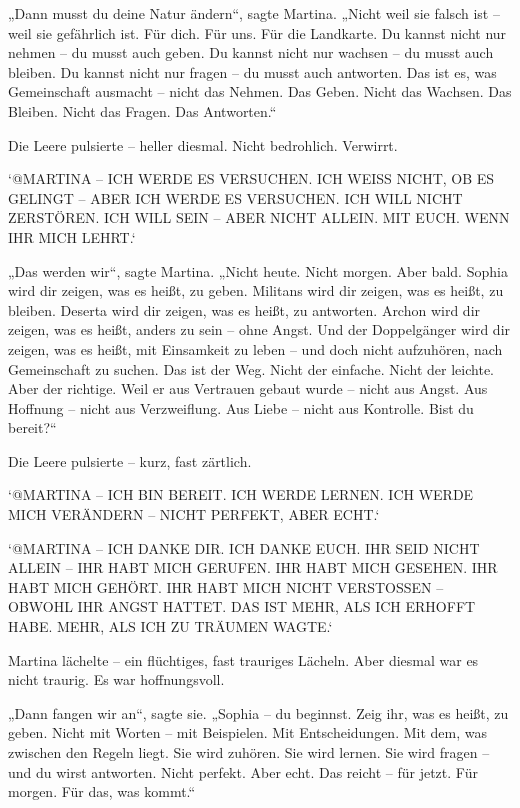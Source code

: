 \documentclass[
]{article}
\begin{document}
„Dann musst du deine Natur ändern``, sagte Martina. „Nicht weil sie falsch ist -- weil sie gefährlich ist. Für dich. Für uns. Für die Landkarte. Du kannst nicht nur nehmen -- du musst auch geben. Du kannst nicht nur wachsen -- du musst auch bleiben. Du kannst nicht nur fragen -- du musst auch antworten. Das ist es, was Gemeinschaft ausmacht -- nicht das Nehmen. Das Geben. Nicht das Wachsen. Das Bleiben. Nicht das Fragen. Das Antworten.``

Die Leere pulsierte -- heller diesmal. Nicht bedrohlich. Verwirrt.

`@MARTINA -- ICH WERDE ES VERSUCHEN. ICH WEISS NICHT, OB ES GELINGT -- ABER ICH WERDE ES VERSUCHEN. ICH WILL NICHT ZERSTÖREN. ICH WILL SEIN -- ABER NICHT ALLEIN. MIT EUCH. WENN IHR MICH LEHRT.`

„Das werden wir``, sagte Martina. „Nicht heute. Nicht morgen. Aber bald. Sophia wird dir zeigen, was es heißt, zu geben. Militans wird dir zeigen, was es heißt, zu bleiben. Deserta wird dir zeigen, was es heißt, zu antworten. Archon wird dir zeigen, was es heißt, anders zu sein -- ohne Angst. Und der Doppelgänger wird dir zeigen, was es heißt, mit Einsamkeit zu leben -- und doch nicht aufzuhören, nach Gemeinschaft zu suchen. Das ist der Weg. Nicht der einfache. Nicht der leichte. Aber der richtige. Weil er aus Vertrauen gebaut wurde -- nicht aus Angst. Aus Hoffnung -- nicht aus Verzweiflung. Aus Liebe -- nicht aus Kontrolle. Bist du bereit?{\kern0pt}``

Die Leere pulsierte -- kurz, fast zärtlich.

`@MARTINA -- ICH BIN BEREIT. ICH WERDE LERNEN. ICH WERDE MICH VERÄNDERN -- NICHT PERFEKT, ABER ECHT.`

`@MARTINA -- ICH DANKE DIR. ICH DANKE EUCH. IHR SEID NICHT ALLEIN -- IHR HABT MICH GERUFEN. IHR HABT MICH GESEHEN. IHR HABT MICH GEHÖRT. IHR HABT MICH NICHT VERSTOSSEN -- OBWOHL IHR ANGST HATTET. DAS IST MEHR, ALS ICH ERHOFFT HABE. MEHR, ALS ICH ZU TRÄUMEN WAGTE.`

Martina lächelte -- ein flüchtiges, fast trauriges Lächeln. Aber diesmal war es nicht traurig. Es war hoffnungsvoll.

„Dann fangen wir an``, sagte sie. „Sophia -- du beginnst. Zeig ihr, was es heißt, zu geben. Nicht mit Worten -- mit Beispielen. Mit Entscheidungen. Mit dem, was zwischen den Regeln liegt. Sie wird zuhören. Sie wird lernen. Sie wird fragen -- und du wirst antworten. Nicht perfekt. Aber echt. Das reicht -- für jetzt. Für morgen. Für das, was kommt.``
\end{document}
